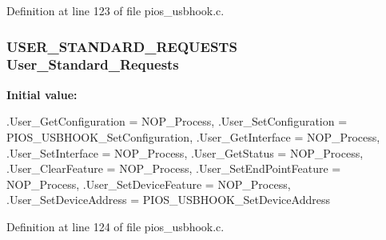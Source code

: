 \-Definition at line 123 of file pios\-\_\-usbhook.\-c.

\hypertarget{group___p_i_o_s___u_s_b_h_o_o_k_ga8d70d0a7e05cf9c172e4304def6b65b8}{
\subsubsection[{\-User\-\_\-\-Standard\-\_\-\-Requests}]{\setlength{\rightskip}{0pt plus 5cm}\-U\-S\-E\-R\-\_\-\-S\-T\-A\-N\-D\-A\-R\-D\-\_\-\-R\-E\-Q\-U\-E\-S\-T\-S {\bf \-User\-\_\-\-Standard\-\_\-\-Requests}}}\label{group___p_i_o_s___u_s_b_h_o_o_k_ga8d70d0a7e05cf9c172e4304def6b65b8}
{\bfseries \-Initial value\-:}
\begin{DoxyCode}
 {
        .User_GetConfiguration   = NOP_Process,
        .User_SetConfiguration   = PIOS_USBHOOK_SetConfiguration,
        .User_GetInterface       = NOP_Process,
        .User_SetInterface       = NOP_Process,
        .User_GetStatus          = NOP_Process,
        .User_ClearFeature       = NOP_Process,
        .User_SetEndPointFeature = NOP_Process,
        .User_SetDeviceFeature   = NOP_Process,
        .User_SetDeviceAddress   = PIOS_USBHOOK_SetDeviceAddress
}
\end{DoxyCode}


\-Definition at line 124 of file pios\-\_\-usbhook.\-c.

